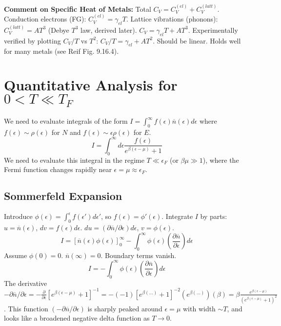 \documentclass[11pt]{article}
\newcommand{\pderiv}[2]{\frac{\partial #1}{\partial #2}}
\newcommand{\eps}{\epsilon}
\newcommand{\nbar}{\overline{n}} %
\newcommand{\ef}{\epsilon_F} %
\newcommand{\tf}{T_F} %
\begin{document}
\textbf{Comment on Specific Heat of Metals:}
Total $C_V = C_V^{(el)} + C_V^{(latt)}$.
Conduction electrons (FG): $C_V^{(el)} = \gamma_{el} T$.
Lattice vibrations (phonons): $C_V^{(latt)} = A T^3$ (Debye $T^3$ law, derived later).
$C_V = \gamma_{el} T + A T^3$.
Experimentally verified by plotting $C_V/T$ vs $T^2$:
$C_V/T = \gamma_{el} + A T^2$. Should be linear. Holds well for many metals (see Reif Fig. 9.16.4).

\section*{Quantitative Analysis for $0 < T \ll \tf$}

We need to evaluate integrals of the form $I = \int_0^\infty f(\eps) \nbar(\eps) d\eps$ where $f(\eps) \sim \rho(\eps)$ for $N$ and $f(\eps) \sim \eps \rho(\eps)$ for $E$.
\[ I = \int_0^\infty d\eps \frac{f(\eps)}{e^{\beta(\eps-\mu)} + 1} \]
We need to evaluate this integral in the regime $T \ll \ef$ (or $\beta\mu \gg 1$), where the Fermi function changes rapidly near $\eps = \mu \approx \ef$.

\subsection*{Sommerfeld Expansion}
Introduce $\phi(\eps) = \int_0^\epsilon f(\eps') d\eps'$, so $f(\eps) = \phi'(\eps)$.
Integrate $I$ by parts: $u = \nbar(\eps)$, $dv = f(\eps) d\eps$. $du = (\partial \nbar / \partial \eps) d\eps$, $v = \phi(\eps)$.
\[ I = [\nbar(\eps) \phi(\eps)]_0^\infty - \int_0^\infty \phi(\eps) \left( \pderiv{\nbar}{\eps} \right) d\eps \]
Assume $\phi(0)=0$. $\nbar(\infty)=0$. Boundary terms vanish.
\[ I = - \int_0^\infty \phi(\eps) \left( \pderiv{\nbar}{\eps} \right) d\eps \]
The derivative $-\partial \nbar / \partial \eps = - \pderiv{}{\eps} [e^{\beta(\eps-\mu)}+1]^{-1} = - (-1)[e^{\beta(\dots)}+1]^{-2} (e^{\beta(\dots)}) (\beta) = \beta \frac{e^{\beta(\eps-\mu)}}{(e^{\beta(\eps-\mu)}+1)^2}$.
This function $(-\partial \nbar / \partial \eps)$ is sharply peaked around $\eps = \mu$ with width $\sim T$, and looks like a broadened negative delta function as $T \to 0$.
\end{document}
